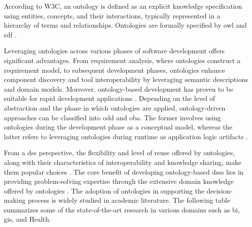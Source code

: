 According to W3C, an ontology is defined as an explicit knowledge
specification using entities, concepts, and their interactions,
typically represented in a hierarchy of terms and relationships.
Ontologies are formally specified by \gls{owl} and \gls{rdf} \autocite{Ponce2022}.

Leveraging ontologies across various phases of software development
offers significant advantages. From requirement analysis, where
ontologies construct a requirement model, to subsequent development
phases, ontologies enhance component discovery and tool
interoperability by leveraging semantic descriptions and domain
models. Moreover, ontology-based development has proven to be suitable for
rapid development applications \autocite{Happel2006}. Depending on
the level of abstraction and the phase in which ontologies are applied,
ontology-driven approaches can be classified into \gls{odd} and \gls{oba}. The former
involves using ontologies during the development phase as a \gls{conceptual
model}, whereas the latter refers to leveraging ontologies during runtime
as application logic artifacts \autocite{DeFreitas2022}.

From a \gls{dss} perspective, the flexibility and level of reuse offered by
ontologies, along with their characteristics of interoperability and
knowledge sharing, make them popular choices \autocite{Hamrouni2021}. The core benefit of developing ontology-based \gls{dss}s lies in
providing problem-solving expertise through the extensive domain
knowledge offered by ontologies \autocite{DeAzevedoJacyntho2021}. The adoption of ontologies in supporting the decision-making process is
widely studied in academic literature. The following table summarizes
some of the state-of-the-art research in various domains such as \gls{bi}, \gls{gis}, and Health.


